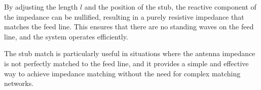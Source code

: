 By adjusting the length \( l \) and the position of the stub, the reactive component of the impedance can be nullified, resulting in a purely resistive impedance that matches the feed line. This ensures that there are no standing waves on the feed line, and the system operates efficiently.

The stub match is particularly useful in situations where the antenna impedance is not perfectly matched to the feed line, and it provides a simple and effective way to achieve impedance matching without the need for complex matching networks.

